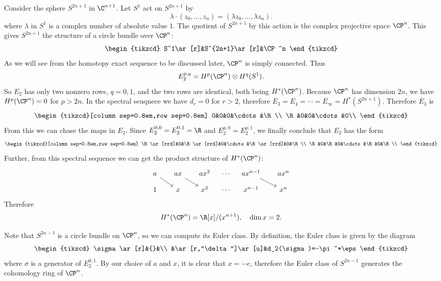 \begin{example}\label{cohomology CP^n}
Consider the sphere $S^{2n+1}$ in $\C^{n+1}$. Let $S^1$ act on $S^{2n+1}$ by
\[\lambda\cdot (z_0,\dots,z_n)=(\lambda z_0,\dots,\lambda z_n).\]
where $\lambda$ in $S^1$ is a complex number of absolute value $1$. The quotient of $S^{2n+1}$ by this action is the complex projective space $\CP^n$. This gives $S^{2n+1}$ 
the structure of a circle bundle over $\CP^n$:
\[\begin{tikzcd}
S^1\ar[r]&S^{2n+1}\ar[r]&\CP^n
\end{tikzcd}\]
As we will see from the homotopy exact sequence to be discussed later, $\CP^n$ is simply connected. Thus
\[E_2^{p,q}=H^p(\CP^n)\otimes H^q(S^1).\]
So $E_2$ has only two nonzero rows, $q=0,1$, and the two rows are identical, both being $H^*(\CP^n)$. Because $\CP^n$ has dimension $2n$, we have $H^p(\CP^n)=0$ for 
$p>2n$. In the spectral seuqnece we have $d_r=0$ for $r>2$, therefore $E_3=E_4=\cdots=E_{\infty}=H^*(S^{2n+1})$. Therefore $E_3$ is
\[\begin{tikzcd}[column sep=0.8em,row sep=0.8em]
0&0&0&\cdots&\R\\
\R&0&0&\cdots&0\\
\end{tikzcd}
\]
From this we can chase the maps in $E_2$. Since $E_2^{0,0}=E_2^{0,1}=\R$ and $E_2^{p,0}=E_2^{p,1}$, we finally conclude that $E_2$ has the form
\[\begin{tikzcd}[column sep=0.8em,row sep=0.8em]
\R\ar[rrd]&0&\R\ar[rrd]&0&\cdots&\R\ar[rrd]&0&\R\\
\R&0&\R&0&\cdots&\R&0&\R\\
\end{tikzcd}\]
Further, from this spectral sequence we can get the product structure of $H^*(\CP^n)$:
\[\begin{tikzcd}[column sep=0.8em,row sep=0.8em]
a\ar[rrd]&&ax\ar[rrd]&&ax^2&\cdots&ax^{n-1}\ar[rrd]&&ax^{n}\\
1&&x&&x^2&\cdots&x^{n-1}&&x^{n}
\end{tikzcd}\]
Therefore
\[H^*(\CP^n)=\R[x]/(x^{n+1}),\quad \dim x=2.\]

Note that $S^{2n-1}$ is a circle bundle on $\CP^n$, so we can compute its Euler class. By definition, the Euler class is given by the diagram
\[\begin{tikzcd}
\sigma\ar[r]&{}&\\
&\ar[r,"\delta"]\ar[u]&d_2(\sigma)=-\pi^*\eps
\end{tikzcd}\]
where $\sigma$ is a generator of $E_2^{0,1}$. By our choice of $a$ and $x$, it is clear that $x=-e$, therefore the Euler class of $S^{2n-1}$ generates the cohomology ring of $\CP^n$.
\end{example}
